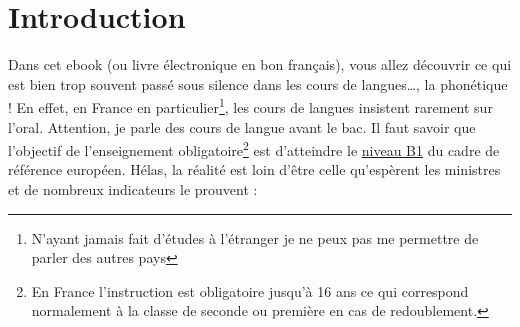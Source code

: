 \chapter{Introduction}
\label{sec:org9288afb}
Dans cet ebook (ou livre électronique en bon français), vous allez
découvrir ce qui est bien trop souvent passé sous silence dans les
cours de langues\ldots{}, la phonétique ! En effet, en France en
particulier\footnote{N'ayant jamais fait d'études à l'étranger je ne
  peux pas me permettre de parler des autres pays}, les cours de
langues insistent rarement sur l'oral. Attention, je parle des cours
de langue avant le bac. Il faut savoir que 
l'objectif de l'enseignement obligatoire\footnote{En France
  l'instruction est obligatoire jusqu'à 16 ans ce qui correspond
  normalement à la classe de seconde ou première en cas de
  redoublement.} est d'atteindre le
\href{http://www.cambridgeenglish.org/fr/exams-and-tests/cambridge-english-certificate-cec/}{niveau
  B1} du cadre de référence européen. Hélas, la réalité est
loin d'être celle qu'espèrent les ministres et de nombreux indicateurs le prouvent :
